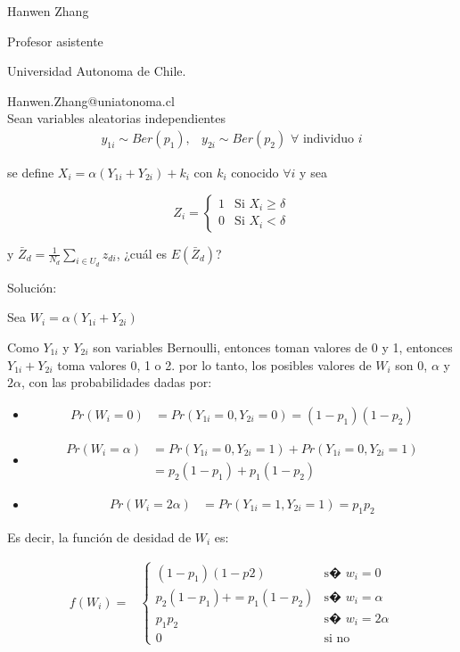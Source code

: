 \documentclass[english]{article}
\begin{document}
Hanwen Zhang 

Profesor asistente 

Universidad Autonoma de Chile. 

Hanwen.Zhang@uniatonoma.cl\\

Sean variables aleatorias independientes
\begin{align*}
y_{1i}\sim Ber\left(p_{1}\right), & y_{2i}\sim Ber\left(p_{2}\right)\,\,\forall\text{ individuo }i
\end{align*}
 

se define $X_{i}=\alpha\left(Y_{1i}+Y_{2i}\right)+k_{i}$ con $k_{i}$
conocido $\forall i$ y sea 

\[
Z_{i}=\begin{cases}
1 & \text{Si }X_{i}\geq\delta\\
0 & \text{Si }X_{i}<\delta
\end{cases}
\]

y $\bar{Z}_{d}=\frac{1}{N_{d}}\sum_{i\in U_{d}}z_{di}$, ¿cu\'al es
$E\left(\bar{Z}_{d}\right)$?

Soluci\'on: 

Sea $W_{i}=\alpha\left(Y_{1i}+Y_{2i}\right)$

Como $Y_{1i}$ y $Y_{2i}$ son variables Bernoulli, entonces toman
valores de 0 y 1, entonces $Y_{1i}+Y_{2i}$ toma valores 0, 1 o 2.
por lo tanto, los posibles valores de $W_{i}$ son $0$, $\alpha$
y $2\alpha$, con las probabilidades dadas por: 
\begin{itemize}
\item 
\begin{align*}
Pr\left(W_{i}=0\right) & =Pr\left(Y_{1i}=0,Y_{2i}=0\right)=\left(1-p_{1}\right)\left(1-p_{2}\right)
\end{align*}
\item 
\begin{align*}
Pr\left(W_{i}=\alpha\right) & =Pr\left(Y_{1i}=0,Y_{2i}=1\right)+Pr\left(Y_{1i}=0,Y_{2i}=1\right)\\
 & =p_{2}\left(1-p_{1}\right)+p_{1}\left(1-p_{2}\right)
\end{align*}
\item 
\begin{align*}
Pr\left(W_{i}=2\alpha\right) & =Pr\left(Y_{1i}=1,Y_{2i}=1\right)=p_{1}p_{2}
\end{align*}
\end{itemize}
Es decir, la funci\'on de desidad de $W_{i}$ es:

\begin{align*}
f\left(W_{i}\right)= & \begin{cases}
\left(1-p_{1}\right)\left(1-p2\right) & \text{s� }w_{i}=0\\
p_{2}\left(1-p_{1}\right)+=p_{1}\left(1-p_{2}\right) & \text{s� }w_{i}=\alpha\\
p_{1}p_{2} & \text{s� }w_{i}=2\alpha\\
0 & \text{si no}
\end{cases}
\end{align*}
\end{document}

